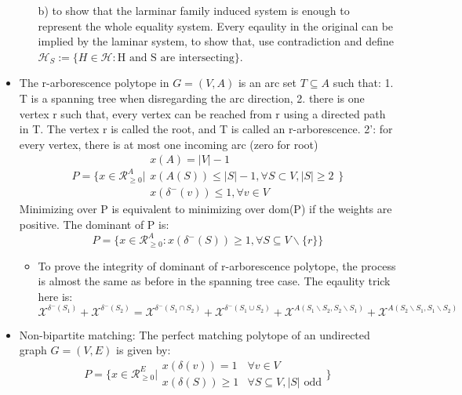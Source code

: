 \documentclass{article}
\begin{document}
\begin{itemize}
\begin{itemize}
b) to show that the larminar family induced system is enough to represent the whole equality system. Every eqaulity in the original can be implied by the laminar system, to show that, use contradiction and define $\mathcal{H}_S:=\{H\in\mathcal{H}: \text{H and S are intersecting}\}$. 
\end{itemize}
\item The r-arborescence polytope in $G=(V,A)$ is an arc set $T\subseteq A$ such that: 1. T is a spanning tree when disregarding the arc direction, 2. there is one vertex r such that, every vertex can be reached from r using a directed path in T. The vertex r is called the root, and T is called an r-arborescence. 2': for every vertex, there is at most one incoming arc (zero for root)
\begin{equation*}
P=\Bigg\{x\in\mathcal{R}_{\geq 0}^A\Bigg|
\begin{array}{lr}
x(A)=|V|-1\\
 x(A(S))\leq |S|-1, \forall S\subset V, |S|\geq 2\\
 x(\delta^-(v))\leq 1, \forall v\in V
\end{array}\Bigg\}
\end{equation*}
Minimizing over P is equivalent to minimizing over dom(P) if the weights are positive. The dominant of P is:
\begin{equation*}
P=\Big\{x\in\mathcal{R}_{\geq 0}^A: x(\delta^-(S))\geq 1, \forall S\subseteq V\backslash\{r\}\Big\}
\end{equation*}
\begin{itemize}
\item To prove the integrity of dominant of r-arborescence polytope, the process is almost the same as before in the spanning tree case. The eqaulity trick here is: \\
$\mathcal{X}^{\delta^-(S_1)}+\mathcal{X}^{\delta^-(S_2)}=\mathcal{X}^{\delta^-(S_1\cap S_2)}+\mathcal{X}^{\delta^-(S_1\cup S_2)}+\mathcal{X}^{A(S_1\backslash S_2,S_2\backslash S_1)}+\mathcal{X}^{A(S_2\backslash S_1,S_1\backslash S_2)}$
\end{itemize}
\item Non-bipartite matching: The perfect matching polytope of an undirected graph $G=(V,E)$ is given by:
\begin{equation*}
P=\Big\{x\in\mathcal{R}_{\geq 0}^E\Big| 
\begin{array}{lr}
x(\delta(v))=1&  \forall v\in V\\
x(\delta(S))\geq 1&  \forall S\subseteq V, |S| \mbox{ odd}
\end{array}\Big\}

\end{equation*}
\end{itemize}
\end{document}
